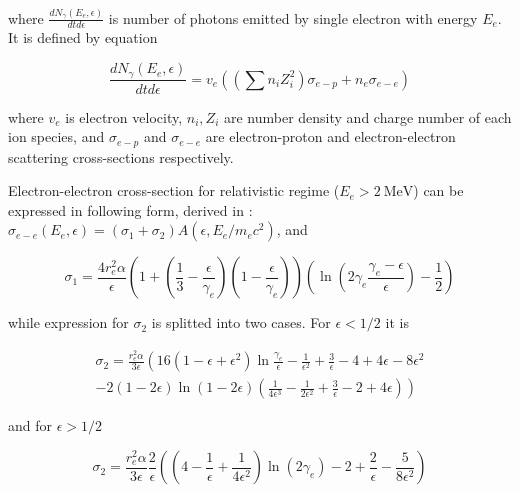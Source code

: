 where $\frac{dN_{\gamma}\left(E_e, \epsilon\right)}{dt d\epsilon}$ is number of photons emitted by single electron with energy $E_e$. It is defined by equation

\begin{equation}
	\frac{dN_{\gamma}\left(E_e, \epsilon\right)}{dt d\epsilon} = v_e \left(\left(\sum n_i Z_i^2\right)\sigma_{e-p} + n_e\sigma_{e-e}\right)
\end{equation}

where $v_e$ is electron velocity, $n_i, Z_i$ are number density and charge number of each ion species, and $\sigma_{e-p}$ and $\sigma_{e-e}$ are electron-proton and electron-electron scattering cross-sections respectively.

Electron-electron cross-section for relativistic regime ($E_e > 2~\text{MeV}$) can be expressed in following form, derived in \cite{BaierJETP1967} : $\sigma_{e-e}(E_e,\epsilon) = \left(\sigma_1 + \sigma_2\right)A\left(\epsilon, E_e/m_e c^2\right)$, and

\begin{equation}\label{sigma1}
	\sigma_1 = \frac{4 r_e^2 \alpha}{\epsilon}\left(1+\left(\frac{1}{3}-\frac{\epsilon}{\gamma_e}\right)\left(1-\frac{\epsilon}{\gamma_e}\right)\right)\left(\ln\left(2\gamma_e\frac{\gamma_e - \epsilon}{\epsilon}\right)-\frac{1}{2}\right)
\end{equation}

while expression for $\sigma_2$ is splitted into two cases. For $\epsilon < 1/2$ it is

\begin{equation}
	\begin{split}
	\sigma_2 = \frac{r_e^2\alpha}{3\epsilon} \left( 16 \left( 1-\epsilon+\epsilon^2 \right) \ln\frac{\gamma_e}{\epsilon}-\frac{1}{\epsilon^2}+\frac{3}{\epsilon}-4+4\epsilon-8\epsilon^2 \right. \\ \left. - 2\left( 1-2\epsilon \right) \ln \left( 1-2\epsilon \right) \left( \frac{1}{4\epsilon^3}-\frac{1}{2\epsilon^2}+\frac{3}{\epsilon}-2+4\epsilon \right) \right)
	\end{split}
\end{equation}

and for $\epsilon > 1/2$

\begin{equation}
	\sigma_2 = \frac{r_e^2\alpha}{3\epsilon}\frac{2}{\epsilon}\left(\left(4-\frac{1}{\epsilon}+\frac{1}{4\epsilon^2}\right)\ln\left(2\gamma_e\right)-2+\frac{2}{\epsilon}-\frac{5}{8\epsilon^2}\right)
\end{equation}

